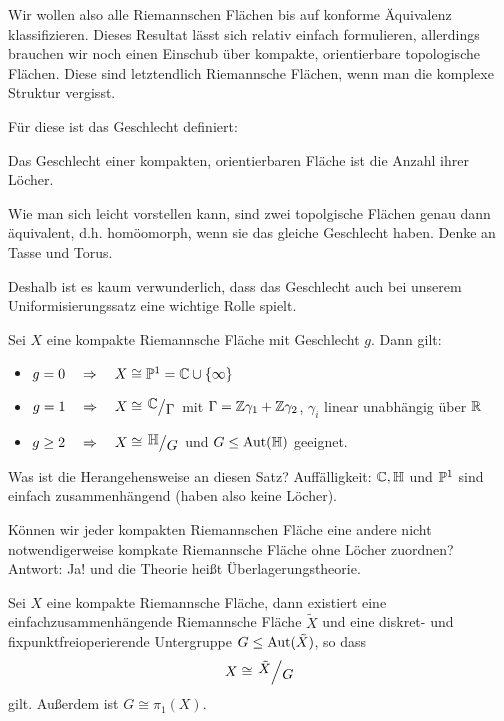 Wir wollen also alle Riemannschen Flächen bis auf konforme Äquivalenz
klassifizieren. Dieses Resultat lässt sich relativ einfach
formulieren, allerdings brauchen wir noch einen Einschub über
kompakte, orientierbare topologische Flächen. Diese sind letztendlich
Riemannsche Flächen, wenn man die komplexe Struktur vergisst.

Für diese ist das Geschlecht definiert:

\begin{defin}
  Das Geschlecht einer kompakten, orientierbaren Fläche ist die Anzahl
  ihrer Löcher.
\end{defin}

Wie man sich leicht vorstellen kann, sind zwei topolgische Flächen
genau dann äquivalent, d.h. homöomorph, wenn sie das gleiche
Geschlecht haben. Denke an Tasse und Torus.

Deshalb ist es kaum verwunderlich, dass das Geschlecht auch bei unserem
Uniformisierungssatz eine wichtige Rolle spielt. 

\begin{thm}
  Sei $X$ eine kompakte Riemannsche Fläche mit Geschlecht $g$. Dann gilt:
  \begin{itemize}
  \item $g = 0 \quad \Ra \quad X \cong \P^1 = \C \cup \{\infty\}$
  \item $g = 1 \quad \Ra \quad X \cong \quot{\C}{\Gamma}$ mit $\Gamma
    = \Z\gamma_1 + \Z \gamma_2$, $\gamma_i$ linear unabhängig über $\R$
  \item $g \geq 2 \quad \Ra \quad X \cong \quot{\h}{G}$ und $G \leq
    \Aut(\h)$ geeignet.
  \end{itemize}
\end{thm}

Was ist die Herangehensweise an diesen Satz? Auffälligkeit: $\C, \h$
und $\P^1$ sind einfach zusammenhängend (haben also keine Löcher).

Können wir jeder kompakten Riemannschen Fläche eine andere nicht
notwendigerweise kompkate Riemannsche Fläche
ohne Löcher zuordnen? Antwort: Ja! und die Theorie heißt
Überlagerungstheorie.

\begin{thm}
  Sei $X$ eine kompakte Riemannsche Fläche, dann existiert eine
  einfachzusammenhängende Riemannsche Fläche $\tilde X$ und eine
  diskret- und fixpunktfreioperierende Untergruppe $G \leq \Aut(\tilde
  X)$, so dass
  \[
  X \cong \quot{\tilde X}{G}
  \]
  gilt. Außerdem ist $G \cong \pi_1(X)$.
\end{thm}

